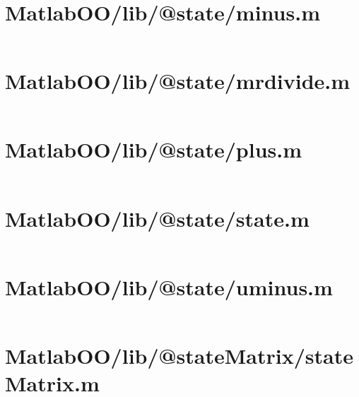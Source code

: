 \pagebreak
\section{MatlabOO/lib/@state/minus.m}\label{code:MatlabOO/lib/@state/minus.m}
\inputminted[linenos,fontsize=\scriptsize]{matlab}{/home/dcouture/git/mathyourlife/TSatPy/beta_versions/matlab_object_oriented/lib/@state/minus.m}

\pagebreak
\section{MatlabOO/lib/@state/mrdivide.m}\label{code:MatlabOO/lib/@state/mrdivide.m}
\inputminted[linenos,fontsize=\scriptsize]{matlab}{/home/dcouture/git/mathyourlife/TSatPy/beta_versions/matlab_object_oriented/lib/@state/mrdivide.m}

\pagebreak
\section{MatlabOO/lib/@state/plus.m}\label{code:MatlabOO/lib/@state/plus.m}
\inputminted[linenos,fontsize=\scriptsize]{matlab}{/home/dcouture/git/mathyourlife/TSatPy/beta_versions/matlab_object_oriented/lib/@state/plus.m}

\pagebreak
\section{MatlabOO/lib/@state/state.m}\label{code:MatlabOO/lib/@state/state.m}
\inputminted[linenos,fontsize=\scriptsize]{matlab}{/home/dcouture/git/mathyourlife/TSatPy/beta_versions/matlab_object_oriented/lib/@state/state.m}

\pagebreak
\section{MatlabOO/lib/@state/uminus.m}\label{code:MatlabOO/lib/@state/uminus.m}
\inputminted[linenos,fontsize=\scriptsize]{matlab}{/home/dcouture/git/mathyourlife/TSatPy/beta_versions/matlab_object_oriented/lib/@state/uminus.m}

\pagebreak
\section{MatlabOO/lib/@stateMatrix/stateMatrix.m}\label{code:MatlabOO/lib/@stateMatrix/stateMatrix.m}
\inputminted[linenos,fontsize=\scriptsize]{matlab}{/home/dcouture/git/mathyourlife/TSatPy/beta_versions/matlab_object_oriented/lib/@stateMatrix/stateMatrix.m}

